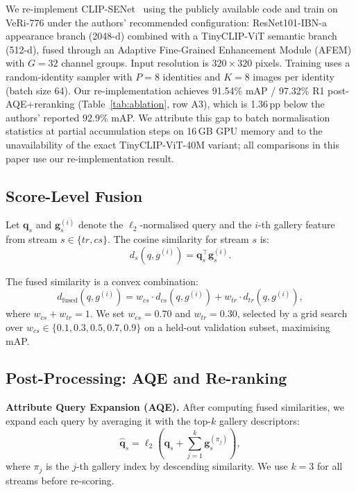\documentclass{ieeeaccess}
\newcommand{\csmap}{91.54}   %
\newcommand{\csrank}{97.32}
\newcommand{\wcs}{0.70}
\newcommand{\wtr}{0.30}
\newcommand{\aqek}{3}
\begin{document}
We re-implement CLIP-SENet~\cite{clipsenet} using the publicly available
code and train on VeRi-776 under the authors' recommended configuration:
ResNet101-IBN-a appearance branch (2048-d) combined with a
TinyCLIP-ViT semantic branch (512-d), fused through an Adaptive
Fine-Grained Enhancement Module (AFEM) with $G{=}32$ channel groups.
Input resolution is $320\times320$ pixels.
Training uses a random-identity sampler with $P{=}8$ identities and
$K{=}8$ images per identity (batch size 64).
Our re-implementation achieves \csmap\% mAP / \csrank\% R1
post-AQE+reranking (Table~\ref{tab:ablation}, row A3), which is
1.36\,pp below the authors' reported 92.9\% mAP.
We attribute this gap to batch normalisation statistics at
partial accumulation steps on 16\,GB GPU memory and to the
unavailability of the exact TinyCLIP-ViT-40M variant; all comparisons
in this paper use our re-implementation result.

\subsection{Score-Level Fusion}
\label{sec:fusion}

Let $\mathbf{q}_s$ and $\mathbf{g}_s^{(i)}$ denote the $\ell_2$-normalised
query and the $i$-th gallery feature from stream $s \in \{tr, cs\}$.
The cosine similarity for stream $s$ is:
\begin{equation}
  d_s(q, g^{(i)}) = \mathbf{q}_s^\top \mathbf{g}_s^{(i)}.
  \label{eq:cosine}
\end{equation}

The fused similarity is a convex combination:
\begin{equation}
  d_\mathrm{fused}(q, g^{(i)})
    = w_{cs} \cdot d_{cs}(q, g^{(i)}) + w_{tr} \cdot d_{tr}(q, g^{(i)}),
  \label{eq:fusion}
\end{equation}
where $w_{cs} + w_{tr} = 1$.
We set $w_{cs} = \wcs$ and $w_{tr} = \wtr$, selected by a
grid search over $w_{cs} \in \{0.1, 0.3, 0.5, 0.7, 0.9\}$
on a held-out validation subset, maximising mAP.

\subsection{Post-Processing: AQE and Re-ranking}
\label{sec:postproc}

\textbf{Attribute Query Expansion (AQE).}
After computing fused similarities, we expand each query by
averaging it with the top-$k$ gallery descriptors:
\begin{equation}
  \hat{\mathbf{q}}_s
    = \ell_2\!\left(
        \mathbf{q}_s
        + \sum_{j=1}^{k} \mathbf{g}_s^{(\pi_j)}
      \right),
  \label{eq:aqe}
\end{equation}
where $\pi_j$ is the $j$-th gallery index by descending similarity.
We use $k{=}\aqek$ for all streams before re-scoring.
\end{document}
